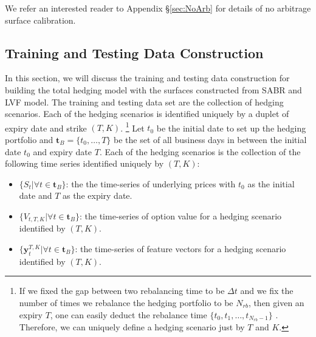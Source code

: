 \documentclass[letterpaper,12pt,titlepage,oneside,final]{book}
\numberwithin{equation}{section}
\theoremstyle{definition}
\newcommand{\vy}{\mathbf{y}}
\newcommand{\DT}{\Delta t}
\begin{document}
We refer an interested reader to Appendix \S \ref{sec:NoArb} for details of no arbitrage surface calibration.

\subsection{Training and Testing Data Construction}
\label{sec:Augtrain}

In this section, we will discuss the training and testing data construction for building the total hedging model with the surfaces constructed from SABR and LVF model. The training and testing data set are the collection of hedging scenarios. Each of the hedging scenarios is identified uniquely by a duplet of expiry date and strike  $(T,K)$. \footnote{ If we fixed the gap between two rebalancing time to be $\DT$ and we fix the number of times we rebalance the hedging portfolio to be $N_{rb}$, then given an expiry $T$, one can easily deduct the rebalance time $\{t_0,t_1, \dots, t_{N_{rb}-1}\}$ . Therefore, we can uniquely define a hedging scenario just by $T$ and $K$.} Let $t_0$ be the initial date to set up the hedging portfolio and $\mathbf{t}_B=\{t_0,\dots,T\}$ be the set of all business days in between the initial date $t_0$ and expiry date $T$.  Each of the hedging scenarios is the collection of the following time series identified uniquely by $(T,K)$:
\begin{itemize}
	\item $\{S_t|\forall t \in \mathbf{t}_B \}$: the the time-series of underlying prices  with $t_0$ as the initial date and $T$ as the expiry date.
	\item $\{V_{t,T,K}|\forall t \in \mathbf{t}_B\}$:  the time-series of option value for a hedging scenario identified by $(T,K)$.
	\item $\{\vy^{T,K}_{t}|\forall t \in \mathbf{t}_B\}$: the time-series of feature vectors for a hedging scenario identified by $(T,K)$.
\end{itemize}
\end{document}
